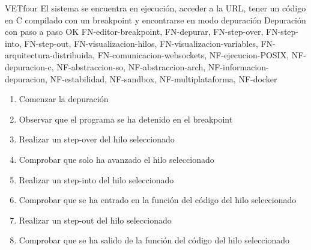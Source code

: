     \begin{testCase}{VET}{four}
        {El sistema se encuentra en ejecución, acceder a la URL, tener un código en C compilado con un breakpoint y encontrarse en modo depuración}
        {\NA}
        {Depuración con paso a paso}
        {OK}
        {FN-editor-breakpoint, FN-depurar, FN-step-over, FN-step-into, FN-step-out, FN-visualizacion-hilos, FN-visualizacion-variables, FN-arquitectura-distribuida, FN-comunicacion-websockets, NF-ejecucion-POSIX, NF-depuracion-c, NF-abstraccion-so, NF-abstraccion-arch, NF-informacion-depuracion, NF-estabilidad, NF-sandbox, NF-multiplataforma, NF-docker}

        \begin{enumerate}
            \item Comenzar la depuración
            \item Observar que el programa se ha detenido en el breakpoint
            \item Realizar un step-over del hilo seleccionado
            \item Comprobar que solo ha avanzado el hilo seleccionado
            \item Realizar un step-into del hilo seleccionado
            \item Comprobar que se ha entrado en la función del código del hilo seleccionado
            \item Realizar un step-out del hilo seleccionado
            \item Comprobar que se ha salido de la función del código del hilo seleccionado
        \end{enumerate}
    \end{testCase}

